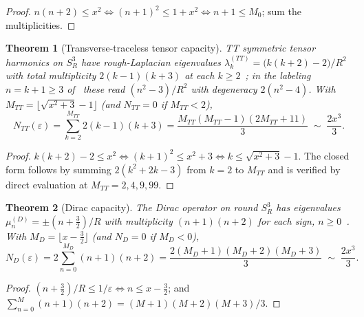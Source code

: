 \documentclass[11pt,a4paper]{article}
\newtheorem{theorem}{Theorem}[section]
\theoremstyle{definition}
\theoremstyle{remark}
\newcommand{\Sthree}{S^{3}}
\begin{document}
\begin{proof}
$n(n+2)\le x^{2}\iff(n+1)^{2}\le1+x^{2}\iff n+1\le M_{0}$; sum the multiplicities.
\end{proof}

\begin{theorem}[Transverse-traceless tensor capacity]
\label{thm:tt}
TT symmetric tensor harmonics on $\Sthree_{R}$ have rough-Laplacian eigenvalues
$\lambda^{(TT)}_{k}=\big(k(k+2)-2\big)/R^{2}$ with total multiplicity $2(k-1)(k+3)$ at each
$k\ge2$~\cite{RubinOrdonez1984,Sandberg1978}; in the labeling $n=k+1\ge3$
of~\cite{RubinOrdonez1984} these read $(n^{2}-3)/R^{2}$ with degeneracy $2(n^{2}-4)$.  With
$M_{TT}=\big\lfloor\sqrt{x^{2}+3}-1\big\rfloor$ (and $N_{TT}=0$ if $M_{TT}<2$),
\begin{equation}
N_{TT}(\varepsilon)=\sum_{k=2}^{M_{TT}}2(k-1)(k+3)
=\frac{M_{TT}(M_{TT}-1)(2M_{TT}+11)}{3}
\;\sim\;\frac{2x^{3}}{3}.
\label{eq:NTT}
\end{equation}
\end{theorem}

\begin{proof}
$k(k+2)-2\le x^{2}\iff(k+1)^{2}\le x^{2}+3\iff k\le\sqrt{x^{2}+3}-1$.  The closed form follows
by summing $2(k^{2}+2k-3)$ from $k=2$ to $M_{TT}$ and is verified by direct evaluation at
$M_{TT}=2,4,9,99$.
\end{proof}

\begin{theorem}[Dirac capacity]
\label{thm:dirac}
The Dirac operator on round $\Sthree_{R}$ has eigenvalues $\mu^{(D)}_{n}=\pm(n+\tfrac32)/R$
with multiplicity $(n+1)(n+2)$ for each sign, $n\ge0$~\cite{Baer1996,PB2026susp}.  With
$M_{D}=\big\lfloor x-\tfrac32\big\rfloor$ (and $N_{D}=0$ if $M_{D}<0$),
\begin{equation}
N_{D}(\varepsilon)=2\sum_{n=0}^{M_{D}}(n+1)(n+2)
=\frac{2(M_{D}+1)(M_{D}+2)(M_{D}+3)}{3}
\;\sim\;\frac{2x^{3}}{3}.
\label{eq:ND}
\end{equation}
\end{theorem}

\begin{proof}
$(n+\tfrac32)/R\le1/\varepsilon\iff n\le x-\tfrac32$; and
$\sum_{n=0}^{M}(n+1)(n+2)=(M+1)(M+2)(M+3)/3$.
\end{proof}
\end{document}
